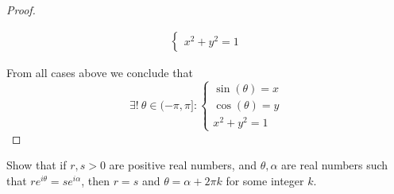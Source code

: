 \begin{proof}
\begin{itemize}
\begin{align*}
\begin{cases}
                                                          x^2 + y^2 = 1
                                                        \end{cases}
          \end{align*}
  \end{itemize}
  From all cases above we conclude that
  \[
    \exists!\ \theta \in (-\pi, \pi] : \begin{cases}
      \sin(\theta) = x \\
      \cos(\theta) = y \\
      x^2 + y^2 = 1
    \end{cases}
  \]
\end{proof}

\begin{exercise}\label{ex 4.7.5}
  Show that if \(r, s > 0\) are positive real numbers, and \(\theta, \alpha\) are real numbers such that \(r e^{i \theta} = s e^{i \alpha}\), then \(r = s\) and \(\theta = \alpha + 2 \pi k\) for some integer \(k\).
\end{exercise}

